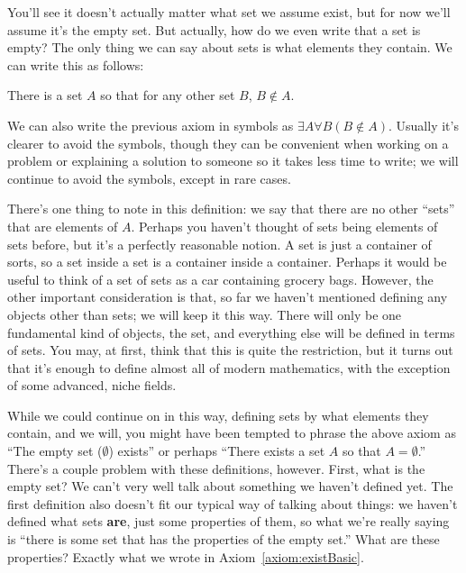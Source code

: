 You'll see it doesn't actually matter what set we assume exist, but for now we'll assume it's the empty set.
But actually, how do we even write that a set is empty?
The only thing we can say about sets is what elements they contain.
We can write this as follows:

\begin{axiom}[Existence]\label{axiom:existBasic}
    There is a set $A$ so that for any other set $B$, $B \not\in A$.
\end{axiom}

We can also write the previous axiom in symbols as $\exists A \forall B (B \not\in A)$.
Usually it's clearer to avoid the symbols, though they can be convenient when working on a problem or explaining a solution to someone so it takes less time to write; we will continue to avoid the symbols, except in rare cases.

There's one thing to note in this definition: we say that there are no other ``sets'' that are elements of $A$.
Perhaps you haven't thought of sets being elements of sets before, but it's a perfectly reasonable notion.
A set is just a container of sorts, so a set inside a set is a container inside a container.
Perhaps it would be useful to think of a set of sets as a car containing grocery bags.
However, the other important consideration is that, so far we haven't mentioned defining any objects other than sets; we will keep it this way.
There will only be one fundamental kind of objects, the set, and everything else will be defined in terms of sets.
You may, at first, think that this is quite the restriction, but it turns out that it's enough to define almost all of modern mathematics, with the exception of some advanced, niche fields.

While we could continue on in this way, defining sets by what elements they contain, and we will, you might have been tempted to phrase the above axiom as ``The empty set ($\emptyset$) exists'' or perhaps ``There exists a set $A$ so that $A = \emptyset$.''
There's a couple problem with these definitions, however. 
First, what is the empty set?
We can't very well talk about something we haven't defined yet.
The first definition also doesn't fit our typical way of talking about things: we haven't defined what sets \textbf{are}, just some properties of them, so what we're really saying is ``there is some set that has the properties of the empty set.''
What are these properties?
Exactly what we wrote in Axiom~\ref{axiom:existBasic}.

